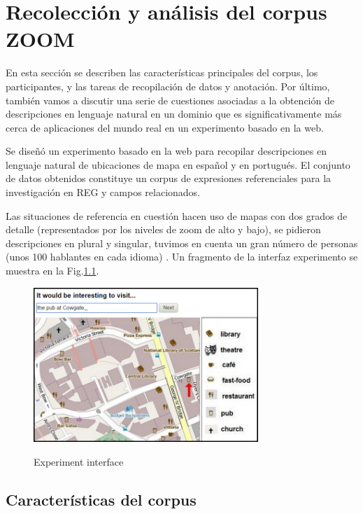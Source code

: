 \chapter{Recolecci\'on y an\'alisis del corpus ZOOM}
\label{sec:corpus}

En esta secci\'on se describen las caracter\'{i}sticas principales del corpus, los participantes, y las tareas de recopilaci\'on de datos y anotaci\'on. Por \'ultimo, tambi\'en vamos a discutir una serie de cuestiones asociadas a la obtenci\'on de descripciones en lenguaje natural en un dominio que es significativamente m\'as cerca de aplicaciones del mundo real en un experimento basado en la web.

Se dise\~n\'o un experimento basado en la web para recopilar descripciones en lenguaje natural de ubicaciones de mapa en espa\~nol y en portugu\'es. El conjunto de datos obtenidos constituye un corpus de expresiones referenciales para la investigaci\'on en REG y campos relacionados.

Las situaciones de referencia en cuesti\'on hacen uso de mapas con dos grados de detalle (representados por los niveles de zoom de alto y bajo), se pidieron descripciones en plural y singular, tuvimos en cuenta un gran n\'umero de personas (unos 100 hablantes en cada idioma) . Un fragmento de la interfaz experimento se muestra en la Fig.\ref{fig-interface}.

\begin{figure}[ht]
\begin{center}
\includegraphics[width=8.5cm]{figures/interface.png}\\[0pt]
\caption{Experiment interface}
\label{fig-interface}
\end{center}
\end{figure}

\section{Caracter\'{i}sticas del corpus}

